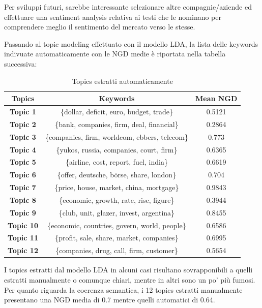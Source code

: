 \documentclass[]{article}
\begin{document}
Per sviluppi futuri, sarebbe interessante selezionare altre compagnie/aziende ed effettuare una sentiment analysis relativa ai testi che le nominano per comprendere meglio il sentimento del mercato verso le stesse.

Passando al topic modeling effettuato con il modello LDA, la lista delle keywords indivuate automaticamente con le NGD medie è riportata nella tabella successiva:

\begin{table}[H]
	\begin{center}
	\begin{tabular}{|c|c|c|}
		\hline 
		\textbf{Topics} & \textbf{Keywords} & \textbf{Mean NGD} \\ 
		\hline 
		\textbf{Topic 1} & \{dollar, deficit, euro, budget, trade\} & 0.5121 \\ 
		\hline 
		\textbf{Topic 2} & \{bank, companies, firm, deal, financial\} & 0.2864 \\ 
		\hline 
		\textbf{Topic 3} & \{companies, firm, worldcom, ebbers, telecom\} & 0.773 \\ 
		\hline 
		\textbf{Topic 4} & \{yukos, russia, companies, court, firm\} & 0.6365 \\ 
		\hline 
		\textbf{Topic 5} & \{airline, cost, report, fuel, india\} & 0.6619 \\ 
		\hline 
		\textbf{Topic 6} & \{offer, deutsche, börse, share, london\} & 0.704 \\ 
		\hline 
		\textbf{Topic 7} & \{price, house, market, china, mortgage\} & 0.9843 \\ 
		\hline 
		\textbf{Topic 8} & \{economic, growth, rate, rise, figure\} & 0.3944 \\ 
		\hline 
		\textbf{Topic 9} & \{club, unit, glazer, invest, argentina\} & 0.8455 \\ 
		\hline 
		\textbf{Topic 10} & \{economic, countries, govern, world, people\} & 0.6586 \\ 
		\hline 
		\textbf{Topic 11} & \{profit, sale, share, market, companies\}  & 0.6995 \\ 
		\hline 
	    \textbf{Topic 12} & \{companies, drug, call, firm, customer\} & 0.5654 \\ 
		\hline 
	\end{tabular} 	
	\caption{Topics estratti automaticamente}
	\end{center}
\end{table}
I topics estratti dal modello LDA in alcuni casi risultano sovrapponibili a quelli estratti manualmente o comunque chiari, mentre in altri sono un po' più fumosi. Per quanto riguarda la coerenza semantica, i 12 topics estratti manualmente presentano una NGD media di 0.7 mentre quelli automatici di 0.64. 
\end{document}
